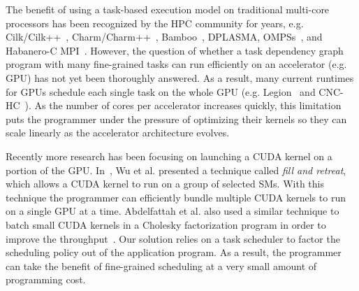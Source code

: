 The benefit of using a task-based execution model on traditional multi-core processors has been recognized by the HPC community for years, e.g. Cilk/Cilk++~\cite{cilk,BlumofeJoKu95}, Charm/Charm++~\cite{charm++}, Bamboo~\cite{bamboo}, DPLASMA\cite{dplasma}, OMPSs~\cite{ompss}, and Habanero-C MPI~\cite{Chatterjee:2013:HCMPI}.
However, the question of whether a task dependency graph program with many fine-grained tasks can run efficiently on an accelerator (e.g. GPU) has not yet been thoroughly answered.
As a result, many current runtimes for GPUs schedule each single task on the whole GPU (e.g. Legion~\cite{legion} and CNC-HC~\cite{cnc-hc}).
As the number of cores per accelerator increases quickly, this limitation puts the programmer under the pressure of optimizing their kernels so they can scale linearly as the accelerator architecture evolves.

Recently more research has been focusing on launching a CUDA kernel on a portion of the GPU.
In~\cite{fillNRetreat}, Wu et al. presented a technique called {\em fill and retreat}, which allows a CUDA kernel to run on a group of selected SMs.
With this technique the programmer can efficiently bundle multiple CUDA kernels to run on a single GPU at a time.
Abdelfattah et al. also used a similar technique to batch small CUDA kernels in a Cholesky factorization program in order to improve the throughput~\cite{batchedCholesky}.
Our solution relies on a task scheduler to factor the scheduling policy out of the application program.
As a result, the programmer can take the benefit of fine-grained scheduling at a very small amount of programming cost.


